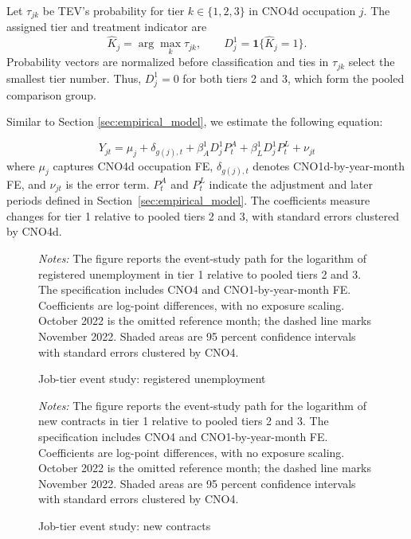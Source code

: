 Let $\tau_{jk}$ be TEV's probability for tier $k\in\{1,2,3\}$ in CNO4d occupation $j$. The assigned tier and treatment indicator are
\begin{equation}
\label{eq:v1_jev_tier_assignment}
\widehat K_j=\arg\max_k\tau_{jk},\qquad D_j^1=\mathbf{1}\{\widehat K_j=1\}.
\end{equation}
Probability vectors are normalized before classification and ties in $\tau_{jk}$ select the smallest tier number. Thus, $D_j^1=0$ for both tiers 2 and 3, which form the pooled comparison group.

Similar to Section \ref{sec:empirical_model}, we estimate the following equation:

\begin{equation}
Y_{jt}=\mu_j+\delta_{g(j),t}+\beta^1_A D^1_jP^A_t+\beta^1_L D^1_jP^L_t+\nu_{jt}
\label{eq:tier_static}
\end{equation}
where $\mu_j$ captures CNO4d occupation FE, $\delta_{g(j),t}$ denotes CNO1d-by-year-month FE, and $\nu_{jt}$ is the error term. $P^A_t$ and $P^L_t$ indicate the adjustment and later periods defined in Section~\ref{sec:empirical_model}. The coefficients measure changes for tier 1 relative to pooled tiers 2 and 3, with standard errors clustered by CNO4d.




\clearpage
\begin{figure}[H]
\centering
\caption{Job-tier event study: registered unemployment}
\label{fig:v1_jev_tiers_unemployed}

\vspace{0.22cm}
\begin{minipage}{0.94\textwidth}
\footnotesize \emph{Notes:} The figure reports the event-study path for the logarithm of registered unemployment in tier 1 relative to pooled tiers 2 and 3. The specification includes CNO4 and CNO1-by-year-month FE. Coefficients are log-point differences, with no exposure scaling. October 2022 is the omitted reference month; the dashed line marks November 2022. Shaded areas are 95 percent confidence intervals with standard errors clustered by CNO4.
\end{minipage}
\end{figure}
\clearpage
\begin{figure}[H]
\centering
\caption{Job-tier event study: new contracts}
\label{fig:v1_jev_tiers_contracts}

\vspace{0.22cm}
\begin{minipage}{0.94\textwidth}
\footnotesize \emph{Notes:} The figure reports the event-study path for the logarithm of new contracts in tier 1 relative to pooled tiers 2 and 3. The specification includes CNO4 and CNO1-by-year-month FE. Coefficients are log-point differences, with no exposure scaling. October 2022 is the omitted reference month; the dashed line marks November 2022. Shaded areas are 95 percent confidence intervals with standard errors clustered by CNO4.
\end{minipage}
\end{figure}
\clearpage


